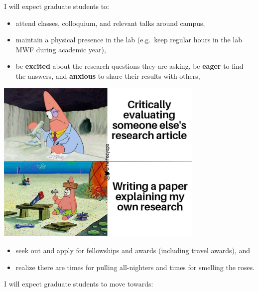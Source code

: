 \documentclass[]{book}
\providecommand{\tightlist}{%
  \setlength{\itemsep}{0pt}\setlength{\parskip}{0pt}}
\begin{document}
I will expect graduate students to:

\begin{itemize}
\tightlist
\item
  attend classes, colloquium, and relevant talks around campus,
\item
  maintain a physical presence in the lab (e.g.~keep regular hours in the lab MWF during academic year),
\item
  be \textbf{excited} about the research questions they are asking, be \textbf{eager} to find the answers, and \textbf{anxious} to share their results with others,
\end{itemize}

\includegraphics[width=0.75\textwidth,height=\textheight]{images/patrick_writing_paper.jpg}

\begin{itemize}
\tightlist
\item
  seek out and apply for fellowships and awards (including travel awards), and\\
\item
  realize there are times for pulling all-nighters and times for smelling the roses.
\end{itemize}

I will expect graduate students to move towards:
\end{document}
